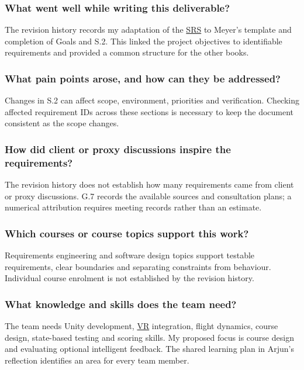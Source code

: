 \documentclass[12pt]{article}
\begin{document}
\subsubsection*{What went well while writing this deliverable?}

The revision history records my adaptation of the \hyperlink{glos:SRS}{SRS} to Meyer's template and completion of Goals and S.2. This linked the project objectives to identifiable requirements and provided a common structure for the other books.

\subsubsection*{What pain points arose, and how can they be addressed?}

Changes in S.2 can affect scope, environment, priorities and verification. Checking affected requirement IDs across these sections is necessary to keep the document consistent as the scope changes.

\subsubsection*{How did client or proxy discussions inspire the requirements?}

The revision history does not establish how many requirements came from client or proxy discussions. G.7 records the available sources and consultation plans; a numerical attribution requires meeting records rather than an estimate.

\subsubsection*{Which courses or course topics support this work?}

Requirements engineering and software design topics support testable requirements, clear boundaries and separating constraints from behaviour. Individual course enrolment is not established by the revision history.

\subsubsection*{What knowledge and skills does the team need?}

The team needs Unity development, \hyperlink{glos:VR}{VR} integration, flight dynamics, course design, state-based testing and scoring skills. My proposed focus is course design and evaluating optional intelligent feedback. The shared learning plan in Arjun's reflection identifies an area for every team member.
\end{document}
